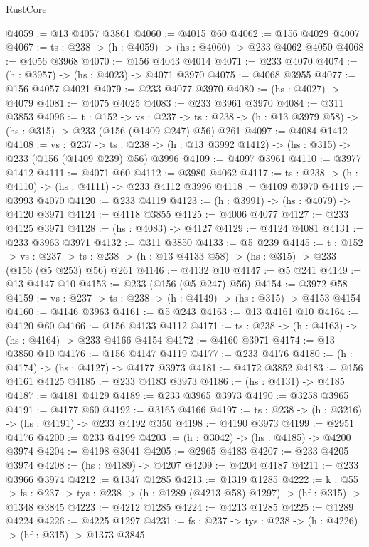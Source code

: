 \begin{lexlean}{RustCore}
\begin{coremodule}
@4059 := @13 @4057 @3861
@4060 := @4015 @60
@4062 := @156 @4029 @4007
@4067 := {ts : @238} -> (h : @4059) -> (hs : @4060) -> @233 @4062 @4050
@4068 := @4056 @3968
@4070 := @156 @4043 @4014
@4071 := @233 @4070
@4074 := (h : @3957) -> (hs : @4023) -> @4071 @3970
@4075 := @4068 @3955
@4077 := @156 @4057 @4021
@4079 := @233 @4077 @3970
@4080 := (hs : @4027) -> @4079
@4081 := @4075 @4025
@4083 := @233 @3961 @3970
@4084 := @311 @3853
@4096 := {t : @152} ->
  {vs : @237} ->
  {ts : @238} -> (h : @13 @3979 @58) -> (hs : @315) -> @233 (@156 (@1409 @247) @56) @261
@4097 := @4084 @1412
@4108 := {vs : @237} ->
  {ts : @238} -> (h : @13 @3992 @1412) -> (hs : @315) -> @233 (@156 (@1409 @239) @56) @3996
@4109 := @4097 @3961
@4110 := @3977 @1412
@4111 := @4071 @60
@4112 := @3980 @4062
@4117 := {ts : @238} -> (h : @4110) -> (hs : @4111) -> @233 @4112 @3996
@4118 := @4109 @3970
@4119 := @3993 @4070
@4120 := @233 @4119
@4123 := (h : @3991) -> (hs : @4079) -> @4120 @3971
@4124 := @4118 @3855
@4125 := @4006 @4077
@4127 := @233 @4125 @3971
@4128 := (hs : @4083) -> @4127
@4129 := @4124 @4081
@4131 := @233 @3963 @3971
@4132 := @311 @3850
@4133 := @5 @239
@4145 := {t : @152} ->
  {vs : @237} -> {ts : @238} -> (h : @13 @4133 @58) -> (hs : @315) -> @233 (@156 (@5 @253) @56) @261
@4146 := @4132 @10
@4147 := @5 @241
@4149 := @13 @4147 @10
@4153 := @233 (@156 (@5 @247) @56)
@4154 := @3972 @58
@4159 := {vs : @237} -> {ts : @238} -> (h : @4149) -> (hs : @315) -> @4153 @4154
@4160 := @4146 @3963
@4161 := @5 @243
@4163 := @13 @4161 @10
@4164 := @4120 @60
@4166 := @156 @4133 @4112
@4171 := {ts : @238} -> (h : @4163) -> (hs : @4164) -> @233 @4166 @4154
@4172 := @4160 @3971
@4174 := @13 @3850 @10
@4176 := @156 @4147 @4119
@4177 := @233 @4176
@4180 := (h : @4174) -> (hs : @4127) -> @4177 @3973
@4181 := @4172 @3852
@4183 := @156 @4161 @4125
@4185 := @233 @4183 @3973
@4186 := (hs : @4131) -> @4185
@4187 := @4181 @4129
@4189 := @233 @3965 @3973
@4190 := @3258 @3965
@4191 := @4177 @60
@4192 := @3165 @4166
@4197 := {ts : @238} -> (h : @3216) -> (hs : @4191) -> @233 @4192 @350
@4198 := @4190 @3973
@4199 := @2951 @4176
@4200 := @233 @4199
@4203 := (h : @3042) -> (hs : @4185) -> @4200 @3974
@4204 := @4198 @3041
@4205 := @2965 @4183
@4207 := @233 @4205 @3974
@4208 := (hs : @4189) -> @4207
@4209 := @4204 @4187
@4211 := @233 @3966 @3974
@4212 := @1347 @1285
@4213 := @1319 @1285
@4222 := {k : @55} ->
  {fs : @237} -> {tys : @238} -> (h : @1289 (@4213 @58) @1297) -> (hf : @315) -> @1348 @3845
@4223 := @4212 @1285
@4224 := @4213 @1285
@4225 := @1289 @4224
@4226 := @4225 @1297
@4231 := {fs : @237} -> {tys : @238} -> (h : @4226) -> (hf : @315) -> @1373 @3845

\end{coremodule}
\end{lexlean}

